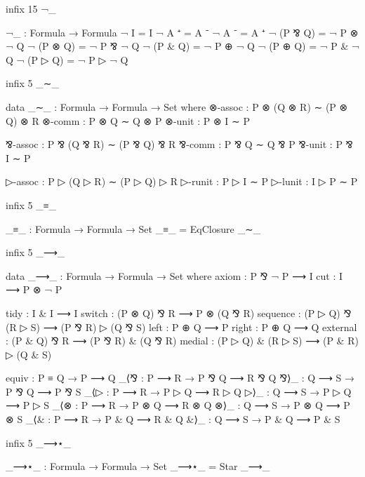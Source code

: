 \begin{code}[hide]
  infix 15 ¬_
\end{code}

\begin{code}
  ¬_ : Formula → Formula
  ¬ I          = I
  ¬ A ⁺        = A ⁻
  ¬ A ⁻        = A ⁺
  ¬ (P  ⅋  Q)  = ¬ P  ⊗  ¬ Q
  ¬ (P  ⊗  Q)  = ¬ P  ⅋  ¬ Q
  ¬ (P  &  Q)  = ¬ P  ⊕  ¬ Q
  ¬ (P  ⊕  Q)  = ¬ P  &  ¬ Q
  ¬ (P  ▷  Q)  = ¬ P  ▷  ¬ Q
\end{code}

\begin{code}[hide]
  infix 5 _∼_
\end{code}

\begin{code}
  data _∼_ : Formula → Formula → Set where
    ⊗-assoc    : P  ⊗ (Q  ⊗ R)  ∼ (P ⊗ Q) ⊗ R
    ⊗-comm     : P  ⊗ Q         ∼ Q ⊗ P
    ⊗-unit     : P  ⊗ I         ∼ P

    ⅋-assoc    : P  ⅋ (Q  ⅋ R)  ∼ (P ⅋ Q) ⅋ R
    ⅋-comm     : P  ⅋ Q         ∼ Q ⅋ P
    ⅋-unit     : P  ⅋ I         ∼ P

    ▷-assoc    : P  ▷ (Q  ▷ R)  ∼ (P  ▷ Q) ▷ R
    ▷-runit    : P  ▷ I         ∼ P
    ▷-lunit    : I  ▷ P         ∼ P
\end{code}

\begin{code}[hide]
  infix 5 _≡_
\end{code}

\begin{code}
  _≡_ : Formula → Formula → Set
  _≡_ = EqClosure _∼_
\end{code}

\begin{code}[hide]
  infix 5 _⟶_
\end{code}

\begin{code}
  data _⟶_ : Formula → Formula → Set where
    axiom      : P ⅋ ¬ P  ⟶ I
    cut        : I        ⟶ P ⊗ ¬ P

    tidy       : I & I              ⟶ I
    switch     : (P ⊗ Q) ⅋ R        ⟶ P ⊗ (Q ⅋ R)
    sequence   : (P ▷ Q) ⅋ (R ▷ S)  ⟶ (P ⅋ R) ▷ (Q ⅋ S)
    left       : P ⊕ Q              ⟶ P
    right      : P ⊕ Q              ⟶ Q
    external   : (P & Q) ⅋ R        ⟶ (P ⅋ R) & (Q ⅋ R)
    medial     : (P ▷ Q) & (R ▷ S)  ⟶ (P & R) ▷ (Q & S)

    equiv      : P  ≡ Q   →  P      ⟶  Q
    _⟨⅋        : P  ⟶  R  →  P ⅋ Q  ⟶  R ⅋ Q
    ⅋⟩_        : Q  ⟶  S  →  P ⅋ Q  ⟶  P ⅋ S
    _⟨▷        : P  ⟶  R  →  P ▷ Q  ⟶  R ▷ Q
    ▷⟩_        : Q  ⟶  S  →  P ▷ Q  ⟶  P ▷ S
    _⟨⊗        : P  ⟶  R  →  P ⊗ Q  ⟶  R ⊗ Q
    ⊗⟩_        : Q  ⟶  S  →  P ⊗ Q  ⟶  P ⊗ S
    _⟨&        : P  ⟶  R  →  P & Q  ⟶  R & Q
    &⟩_        : Q  ⟶  S  →  P & Q  ⟶  P & S
\end{code}

\begin{code}[hide]
  infix 5 _⟶⋆_
\end{code}

\begin{code}
  _⟶⋆_ : Formula → Formula → Set
  _⟶⋆_ = Star _⟶_
\end{code}
